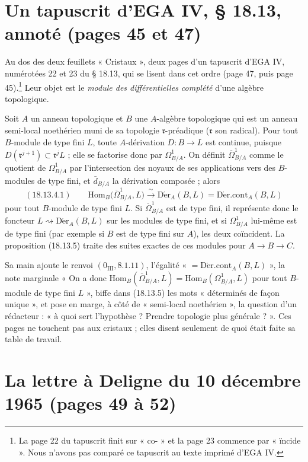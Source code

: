 \documentclass[11pt,a4paper]{article}
\begin{document}
\section*{Un tapuscrit d'EGA IV, § 18.13, annoté (pages 45 et 47)}

Au dos des deux feuillets « Cristaux », deux pages d'un tapuscrit d'EGA IV,
numérotées 22 et 23 du § 18.13, qui se lisent dans cet ordre (page 47, puis
page 45).\footnote{La page 22 du tapuscrit finit sur « co- » et la page 23
commence par « ïncide ». Nous n'avons pas comparé ce tapuscrit au texte
imprimé d'EGA IV.} Leur objet est le \emph{module des différentielles
complété} d'une algèbre topologique.

Soit $A$ un anneau topologique et $B$ une $A$-algèbre topologique qui est un
anneau semi-local noethérien muni de sa topologie $\mathfrak{r}$-préadique
($\mathfrak{r}$ son radical). Pour tout $B$-module de type fini $L$, toute
$A$-dérivation $D : B \to L$ est continue, puisque $D(\mathfrak{r}^{j+1})
\subset \mathfrak{r}^{j}L$ ; elle se factorise donc par $\Omega^{1}_{B/A}$.
On définit $\overline{\Omega}^{1}_{B/A}$ comme le quotient de
$\Omega^{1}_{B/A}$ par l'intersection des noyaux de ses applications vers
des $B$-modules de type fini, et $\bar d_{B/A}$ la dérivation composée ;
alors
\[
(18.13.4.1) \qquad \mathrm{Hom}_B\bigl(\overline{\Omega}^{1}_{B/A}, L\bigr)
\xrightarrow{\ \sim\ } \mathrm{D\acute{e}r}_A(B, L) =
\mathrm{D\acute{e}r.cont}_A(B, L)
\]
pour tout $B$-module de type fini $L$. Si $\overline{\Omega}^{1}_{B/A}$ est de
type fini, il représente donc le foncteur $L \rightsquigarrow
\mathrm{D\acute{e}r}_A(B, L)$ sur les modules de type fini, et si
$\Omega^{1}_{B/A}$ lui-même est de type fini (par exemple si $B$ est de type
fini sur $A$), les deux coïncident. La proposition (18.13.5) traite des
suites exactes de ces modules pour $A \to B \to C$.

Sa main ajoute le renvoi $(0_{\mathrm{III}}, 8.1.11)$, l'égalité
« $= \mathrm{D\acute{e}r.cont}_A(B, L)$ », la note marginale
« On a donc $\mathrm{Hom}_B(\overline{\Omega}^{1}_{B/A}, L) =
\mathrm{Hom}_B(\Omega^{1}_{B/A}, L)$ pour tout $B$-module de type fini $L$ »,
biffe dans (18.13.5) les mots « déterminés de façon unique », et pose en
marge, à côté de « semi-local noethérien », la question d'un rédacteur :
« à quoi sert l'hypothèse ? Prendre topologie plus générale ? ». Ces pages
ne touchent pas aux cristaux ; elles disent seulement de quoi était faite sa
table de travail.

\section*{La lettre à Deligne du 10 décembre 1965 (pages 49 à 52)}
\end{document}
